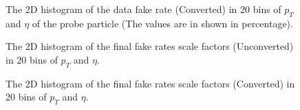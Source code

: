 \begin{figure}[htbp]
\begin{center}
\scalebox{0.6}{}
\caption{The 2D histogram of the data fake rate (Converted) in 20 bins of $p_{T}$ and $\eta$ of the probe particle (The values are in shown in percentage).}
\label{fig:hc2_data_fc}
\end{center}
\end{figure}

\begin{figure}[H]
\begin{center}
\scalebox{0.6}{}
\caption{The 2D histogram of the final fake rates scale factors (Unconverted) in 20 bins of $p_{T}$ and $\eta$.}
\label{fig:hu2_sf}
\end{center}
\end{figure}

\begin{figure}[H]
\begin{center}
\scalebox{0.6}{}
\caption{The 2D histogram of the final fake rates scale factors (Converted) in 20 bins of $p_{T}$ and $\eta$.}
\label{fig:hc2_sf}
\end{center}
\end{figure}
